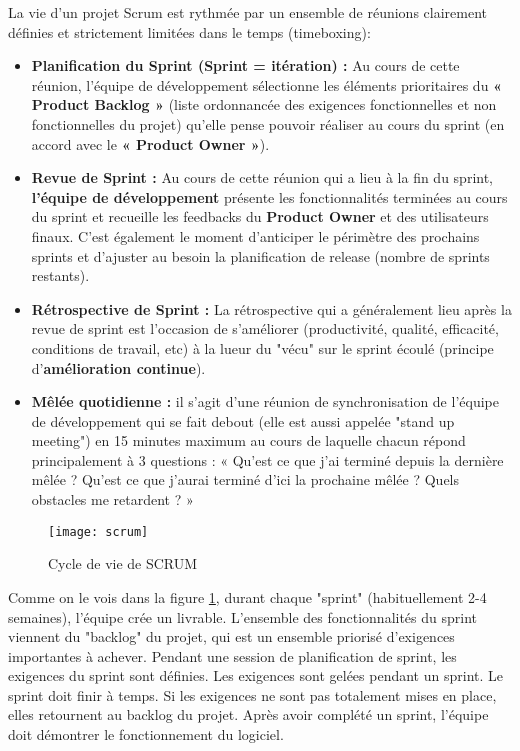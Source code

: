 La vie d'un projet Scrum est rythmée par un ensemble de réunions clairement définies et strictement limitées dans le temps (timeboxing):
\begin{itemize}
    \item \textbf{Planification du Sprint (Sprint = itération) :} Au cours de cette réunion, l'équipe de développement sélectionne les éléments prioritaires du \textbf{« Product Backlog »} (liste ordonnancée des exigences fonctionnelles et non fonctionnelles du projet) qu'elle pense pouvoir réaliser au cours du sprint (en accord avec le \textbf{« Product Owner »}).
    \item \textbf{Revue de Sprint : } Au cours de cette réunion qui a lieu à la fin du sprint, \textbf{l'équipe de développement} présente les fonctionnalités terminées au cours du sprint et recueille les feedbacks du \textbf{Product Owner} et des utilisateurs finaux. C'est également le moment d'anticiper le périmètre des prochains sprints et d'ajuster au besoin la planification de release (nombre de sprints restants).
    \item \textbf{Rétrospective de Sprint : }La rétrospective qui a généralement lieu après la revue de sprint est l'occasion de s'améliorer (productivité, qualité, efficacité, conditions de travail, etc) à la lueur du "vécu" sur le sprint écoulé (principe d'\textbf{amélioration continue}).
    \item \textbf{Mêlée quotidienne : }il s'agit d'une réunion de synchronisation de l'équipe de développement qui se fait debout (elle est aussi appelée "stand up meeting") en 15 minutes maximum au cours de laquelle chacun répond principalement à 3 questions : « Qu'est ce que j'ai terminé depuis la dernière mêlée ? Qu'est ce que j'aurai terminé d'ici la prochaine mêlée ? Quels obstacles me retardent ? »
\end{itemize}
\begin{figure}[H]
    \centering
    \texttt{[image: scrum]}
    \caption{Cycle de vie de SCRUM}
    \label{fig:scrum}
\end{figure}

Comme on le vois dans la figure \ref{fig:scrum}, durant chaque "sprint" (habituellement 2-4 semaines), l'équipe crée un livrable. L'ensemble des fonctionnalités du sprint viennent du "backlog" du projet, qui est un ensemble priorisé d'exigences importantes à achever. Pendant une session de planification de sprint, les exigences du sprint sont définies. Les exigences sont gelées pendant un sprint. Le sprint doit finir à temps. Si les exigences ne sont pas totalement mises en place, elles retournent au backlog du projet. Après avoir complété un sprint, l'équipe doit démontrer le fonctionnement du logiciel.

